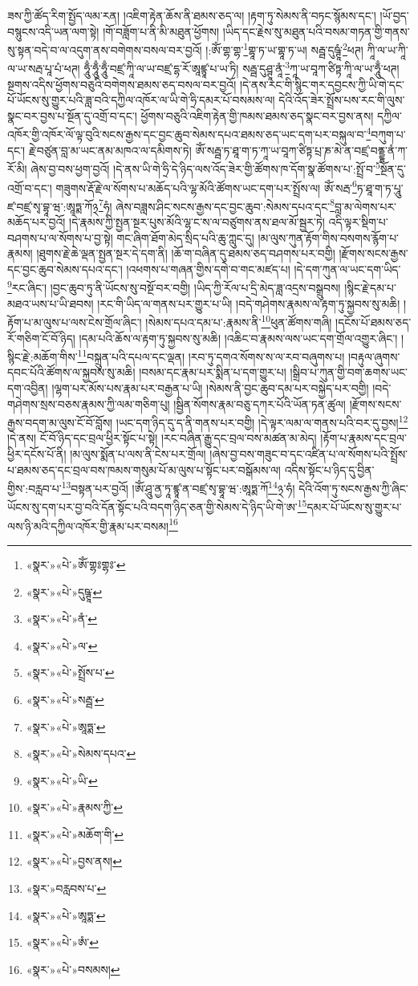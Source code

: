 ཟས་ཀྱི་ཚོད་རིག་སྤྱོད་ལམ་རན། །འཇིག་རྟེན་ཆོས་ནི་ཐམས་ཅད་ལ། །རྟག་ཏུ་སེམས་ནི་བཏང་སྙོམས་དང་། །ཡོ་བྱད་བསྙུངས་འདི་ཡན་ལག་སྟེ། །གོ་བཟློག་པ་ནི་མི་མཐུན་ཕྱོགས། །ཡིད་དང་རྗེས་སུ་མཐུན་པའི་བསམ་གཏན་གྱི་གནས་སུ་སྟན་བདེ་བ་ལ་འདུག་ནས་བགེགས་བསལ་བར་བྱའོ། །:ཨོཾ་གྷ་གྷ་\footnote{«སྣར་»«པེ་»ཨོཾ་གྷཿགྷཿ་}གྷཱ་ཏ་ཡ་གྷཱ་ཏ་ཡ། སརྦྦ་དུཥྚཱཾ་\footnote{«སྣར་»«པེ་»དུཥྚཱ་}ཕཊ། ཀཱི་ལ་ཡ་ཀཱི་ལ་ཡ་སརྦ་པཱ་པཾ་ཕཊ། ཧཱུྃ་ཧཱུྃ་ཧཱུྃ་བཛྲ་ཀཱི་ལ་ཡ་བཛྲ་དྷ་རོ་ཨཱཛྙཱ་པ་ཡ་ཏི། སརྦྦ་དུཤྚཱ་ནཱཾ་\footnote{«སྣར་»«པེ་»ནཾ་}ཀཱ་ཡ་བཱཀ་ཙིཏྟ་ཀཱི་ལ་ཡ་ཧཱུྃ་ཕཊ། སྔགས་འདིས་ཕྱོགས་བཅུའི་བགེགས་ཐམས་ཅད་བསལ་བར་བྱའོ། །དེ་ནས་རང་གི་སྙིང་གར་དབྱངས་ཀྱི་ཡི་གེ་དང་པོ་ཡོངས་སུ་གྱུར་པའི་ཟླ་བའི་དཀྱིལ་འཁོར་ལ་ཡི་གེ་ཧྲི་དམར་པོ་བསམས་ལ། དེའི་འོད་ཟེར་སྤྲོས་པས་རང་གི་ལུས་སྣང་བར་བྱས་པ་སྔོན་དུ་འགྲོ་བ་དང་། ཕྱོགས་བཅུའི་འཇིག་རྟེན་གྱི་ཁམས་ཐམས་ཅད་སྣང་བར་བྱས་ནས། དཀྱིལ་འཁོར་གྱི་འཁོར་ལོ་ལྟ་བུའི་སངས་རྒྱས་དང་བྱང་ཆུབ་སེམས་དཔའ་ཐམས་ཅད་ཡང་དག་པར་བསྐུལ་བ་\footnote{«སྣར་»«པེ་»ལ་}བཀུག་པ་དང་། རྗེ་བཙུན་བླ་མ་ཡང་ནམ་མཁའ་ལ་དམིགས་ཏེ། ཨོཾ་སརྦྦ་ཏ་ཐཱ་ག་ཏ་ཀཱ་ཡ་བཱཀ་ཙིཏྟ་པྲ་ཎ་མེ་ན་བཛྲ་བནྡྷ་ནཾ་ཀ་རོ་མི། ཞེས་བྱ་བས་ཕྱག་བྱའོ། །དེ་ནས་ཡི་གེ་ཧྲི་དེ་ཉིད་ལས་འོད་ཟེར་གྱི་ཚོགས་ཁ་དོག་སྣ་ཚོགས་པ་:སྤྲོ་བ་\footnote{«སྣར་»«པེ་»སྤྲོས་པ་}སྔོན་དུ་འགྲོ་བ་དང་། གཟུགས་རྡོ་རྗེ་ལ་སོགས་པ་མཆོད་པའི་ལྷ་མོའི་ཚོགས་ཡང་དག་པར་སྤྲོས་ལ། ཨོཾ་སརྦ་\footnote{«སྣར་»«པེ་»སརྦྦ་}ཏ་ཐཱ་ག་ཏ་པཱུ་ཛ་བཛྲ་སྭ་བྷཱ་ཝ་:ཨཱཏྨ་ཀོ྅\footnote{«སྣར་»«པེ་»ཨཱཏྨ་}ཧཾ། ཞེས་བཟླས་ཤིང་སངས་རྒྱས་དང་བྱང་ཆུབ་:སེམས་དཔའ་དང་\footnote{«སྣར་»«པེ་»སེམས་དཔའ་}བླ་མ་ལེགས་པར་མཆོད་པར་བྱའོ། །དེ་རྣམས་ཀྱི་སྤྱན་སྔར་པུས་མོའི་ལྷ་ང་ས་ལ་བཙུགས་ནས་ཐལ་མོ་སྦྱར་ཏེ། འདི་ལྟར་སྡིག་པ་བཤགས་པ་ལ་སོགས་པ་བྱ་སྟེ། གང་ཞིག་ཐོག་མེད་སྲིད་པའི་ཆུ་ཀླུང་དུ། །མ་ལུས་ཀུན་རྟོག་གིས་བསགས་རྙོག་པ་རྣམས། །ཐུགས་རྗེ་ཆེ་ལྡན་སྤྱན་སྔར་དེ་དག་ནི། །ཆོ་ག་བཞིན་དུ་ཐམས་ཅད་བཤགས་པར་བགྱི། །རྫོགས་སངས་རྒྱས་དང་བྱང་ཆུབ་སེམས་དཔའ་དང་། །འཕགས་པ་གཞན་གྱིས་དགེ་བ་གང་མཛད་པ། །དེ་དག་ཀུན་ལ་ཡང་དག་ཡིད་\footnote{«སྣར་»«པེ་»ཡི་}རང་ཞིང་། །བྱང་ཆུབ་ཏུ་ནི་ཡོངས་སུ་བསྔོ་བར་བགྱི། །ཡིད་ཀྱི་རོལ་པ་དྲི་མེད་ཟླ་འདྲས་བསྒྲུབས། །སྙིང་རྗེ་དམ་པ་མཐའ་ཡས་པ་ཡི་ཐབས། །རང་གི་ཡིད་ལ་གནས་པར་གྱུར་པ་ཡི། །བདེ་གཤེགས་རྣམས་ལ་རྟག་ཏུ་སྐྱབས་སུ་མཆི། །རྟོག་པ་མ་ལུས་པ་ལས་ངེས་གྲོལ་ཞིང་། །སེམས་དཔའ་དམ་པ་:རྣམས་ནི་\footnote{«སྣར་»«པེ་»རྣམས་ཀྱི་}ཕུན་ཚོགས་གཞི། །དངོས་པོ་ཐམས་ཅད་རོ་གཅིག་ངོ་བོ་ཉིད། །དམ་པའི་ཆོས་ལ་རྟག་ཏུ་སྐྱབས་སུ་མཆི། །འཆིང་བ་རྣམས་ལས་ཡང་དག་གྲོལ་འགྱུར་ཞིང་། །སྙིང་རྗེ་:མཆོག་གིས་\footnote{«སྣར་»«པེ་»མཆོག་གི་}བསྐྲུན་པའི་དཔལ་དང་ལྡན། །རབ་ཏུ་དགའ་སོགས་ས་ལ་རབ་བཞུགས་པ། །བརྟུལ་ཞུགས་དབང་པོའི་ཚོགས་ལ་སྐྱབས་སུ་མཆི། །བསམ་དང་རྣམ་པར་སྨིན་པ་དག་གྱུར་པ། །སྒྲིབ་པ་ཀུན་གྱི་བག་ཆགས་ཡང་དག་འབྱིན། །ལྷག་པར་མོས་པས་རྣམ་པར་བརྒྱན་པ་ཡི། །སེམས་ནི་བྱང་ཆུབ་དམ་པར་བསྐྱེད་པར་བགྱི། །བདེ་གཤེགས་སྲས་བཅས་རྣམས་ཀྱི་ལམ་གཅིག་པུ། །སྦྱིན་སོགས་རྣམ་བཅུ་དཀར་པོའི་ཡོན་ཏན་ཚུལ། །རྫོགས་སངས་རྒྱས་བདག་མ་ལུས་ངོ་བོ་བློས། །ཡང་དག་ཉིད་དུ་ད་ནི་གནས་པར་བགྱི། །དེ་ལྟར་ལམ་ལ་གནས་པའི་བར་དུ་བྱས།\footnote{«སྣར་»«པེ་»བྱས་ནས།} །དེ་ནས། ངོ་བོ་ཉིད་དང་བྲལ་ཕྱིར་སྟོང་པ་སྟེ། །རང་བཞིན་རྒྱུ་དང་བྲལ་བས་མཚན་མ་མེད། །རྟོག་པ་རྣམས་དང་བྲལ་ཕྱིར་དངོས་པོ་ནི། །མ་ལུས་སྨོན་པ་ལས་ནི་ངེས་པར་གྲོལ། །ཞེས་བྱ་བས་གཟུང་བ་དང་འཛིན་པ་ལ་སོགས་པའི་སྤྲོས་པ་ཐམས་ཅད་དང་བྲལ་བས་ཁམས་གསུམ་པོ་མ་ལུས་པ་སྟོང་པར་བསྒོམས་ལ། འདིས་སྟོང་པ་ཉིད་དུ་བྱིན་གྱིས་:བརླབ་པ་\footnote{«སྣར་»བརླབས་པ་}བསྟན་པར་བྱའོ། །ཨོཾ་ཤཱུ་ནྱ་ཏཱ་ཛྙཱ་ན་བཛྲ་སྭ་བྷཱ་ཝ་:ཨཱཏྨ་ཀོ\footnote{«སྣར་»«པེ་»ཨཱཏྨ་}྅་ཧཾ། དེའི་འོག་ཏུ་སངས་རྒྱས་ཀྱི་ཞིང་ཡོངས་སུ་དག་པར་བྱ་བའི་དོན་སྟོང་པའི་བདག་ཉིད་ཅན་གྱི་སེམས་དེ་ཉིད་ཡི་གེ་ཨ་\footnote{«སྣར་»«པེ་»ཨཾ་}དམར་པོ་ཡོངས་སུ་གྱུར་པ་ལས་ཉི་མའི་དཀྱིལ་འཁོར་གྱི་རྣམ་པར་བསམ།\footnote{«སྣར་»«པེ་»བསམས།} 